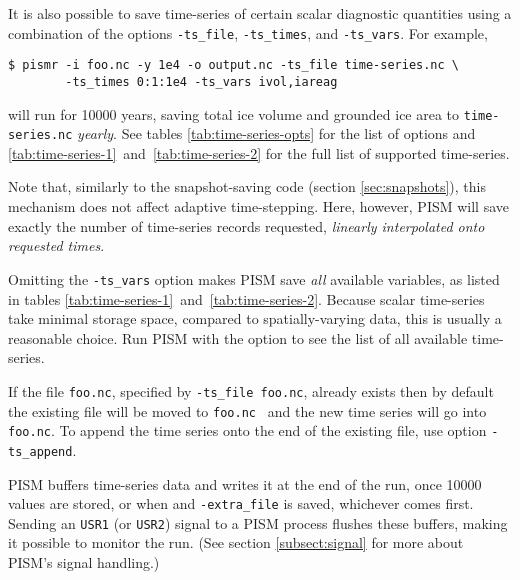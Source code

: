  It is also possible to save time-series of certain scalar diagnostic quantities using a combination of the options \texttt{-ts_file}, \texttt{-ts_times}, and \texttt{-ts_vars}.  For example,
\begin{verbatim}
$ pismr -i foo.nc -y 1e4 -o output.nc -ts_file time-series.nc \
        -ts_times 0:1:1e4 -ts_vars ivol,iareag
\end{verbatim} %
will run for 10000 years, saving total ice volume and grounded ice area to \texttt{time-series.nc} \emph{yearly}. See tables \ref{tab:time-series-opts} for the list of options and \ref{tab:time-series-1}~and~\ref{tab:time-series-2} for the full list of supported time-series.

Note that, similarly to the snapshot-saving code (section \ref{sec:snapshots}), this mechanism does not affect adaptive time-stepping.  Here, however, PISM will save exactly the number of time-series records requested, \emph{linearly interpolated onto requested times}.

Omitting the \texttt{-ts_vars} option makes PISM save \emph{all} available
variables, as listed in tables
\ref{tab:time-series-1}~and~\ref{tab:time-series-2}.  Because scalar
time-series take minimal storage space, compared to spatially-varying data,
this is usually a reasonable choice. Run PISM with the
 option to see the list of all available time-series.

If the file \texttt{foo.nc}, specified by \texttt{-ts_file foo.nc}, already exists then by default the existing file will be moved to \texttt{foo.nc~} and the new time series will go into \texttt{foo.nc}.  To append the time series onto the end of the existing file, use option \texttt{-ts_append}.

PISM buffers time-series data and writes it at the end of the run, once 10000
values are stored, or when and \texttt{-extra_file} is saved, whichever comes first. Sending an \texttt{USR1} (or
\texttt{USR2}) signal to a PISM process flushes these buffers, making it
possible to monitor the run. (See section \ref{subsect:signal} for more about
PISM's signal handling.)

